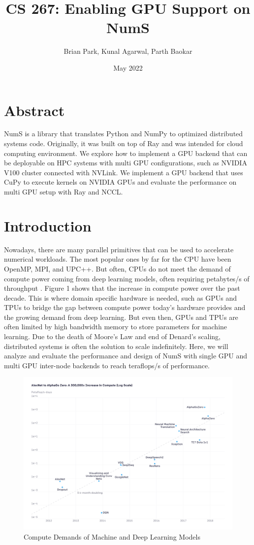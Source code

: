 \documentclass{article}
\title{CS 267: Enabling GPU Support on NumS}
\author{Brian Park, Kunal Agarwal, Parth Baokar}
\date{May 2022}
\begin{document}
\maketitle

\section*{Abstract}
NumS is a library that translates Python and NumPy to optimized distributed systems code. Originally, it was built on top of Ray and was intended for cloud computing environment. We explore how to implement a GPU backend that can be deployable on HPC systems with multi GPU configurations, such as NVIDIA V100 cluster connected with NVLink. We implement a GPU backend that uses CuPy to execute kernels on NVIDIA GPUs and evaluate the performance on multi GPU setup with Ray and NCCL.

\section{Introduction}
Nowadays, there are many parallel primitives that can be used to accelerate numerical workloads. The most popular ones by far for the CPU have been OpenMP, MPI, and UPC++. But often, CPUs do not meet the demand of compute power coming from deep learning models, often requiring petabytes/s of throughput \cite{openai}. Figure 1 shows that the increase in compute power over the past decade. This is where domain specific hardware is needed, such as GPUs and TPUs to bridge the gap between compute power today's hardware provides and the growing demand from deep learning. But even then, GPUs and TPUs are often limited by high bandwidth memory to store parameters for machine learning. Due to the death of Moore's Law and end of Denard's scaling, distributed systems is often the solution to scale indefinitely. Here, we will analyze and evaluate the performance and design of NumS with single GPU and multi GPU inter-node backends to reach teraflops/s of performance.

\begin{figure}
  \centerline{\includegraphics[width=6in]{figures/ai-and-compute-modern-log.png}}
  \caption{Compute Demands of Machine and Deep Learning Models}
\end{figure}
\end{document}
